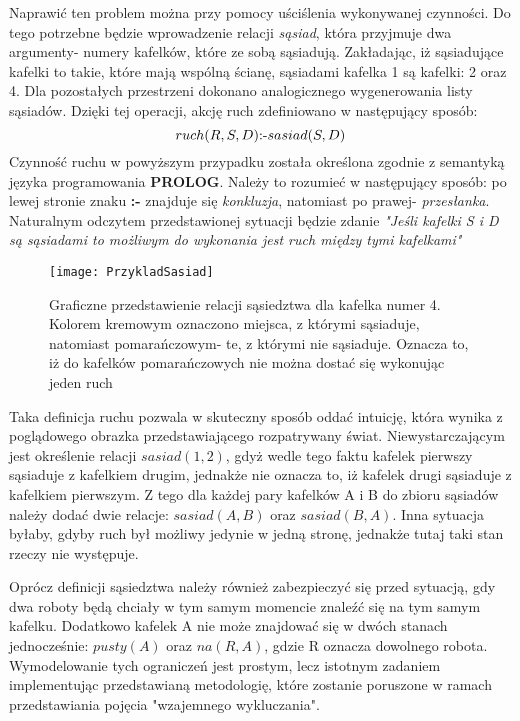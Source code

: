     Naprawić ten problem można przy pomocy uściślenia wykonywanej czynności. Do tego potrzebne będzie wprowadzenie relacji \textit{sąsiad}, która 
    przyjmuje dwa argumenty- numery kafelków, które ze sobą sąsiadują. Zakładając, iż sąsiadujące kafelki to takie, które mają wspólną ścianę, sąsiadami 
    kafelka 1 są kafelki: 2 oraz 4. Dla pozostałych przestrzeni dokonano analogicznego wygenerowania listy sąsiadów. Dzięki tej operacji, 
    akcję ruch zdefiniowano w następujący sposób:
    \begin{equation}
        ruch(R,S,D) \textnormal{:-} sasiad(S,D)
    \end{equation}
    Czynność ruchu w powyższym przypadku została określona zgodnie z semantyką języka programowania \textbf{PROLOG}. Należy to rozumieć w następujący sposób:
    po lewej stronie znaku \textbf{:-} znajduje się \textit{konkluzja}, natomiast po prawej- \textit{przesłanka}. Naturalnym odczytem przedstawionej sytuacji
    będzie zdanie \textit{"Jeśli kafelki S i D są sąsiadami to możliwym do wykonania jest ruch między tymi kafelkami"}
    \begin{figure}[H]
        \texttt{[image: PrzykladSasiad]}
        \centering
        \caption{Graficzne przedstawienie relacji sąsiedztwa dla kafelka numer 4. Kolorem kremowym oznaczono miejsca, z którymi sąsiaduje, natomiast 
        pomarańczowym- te, z którymi nie sąsiaduje. Oznacza to, iż do kafelków pomarańczowych nie można dostać się wykonując jeden ruch}
        \label{PrzykladAkcje}
    \end{figure}
    Taka definicja ruchu pozwala w skuteczny sposób oddać intuicję, która wynika z poglądowego obrazka przedstawiającego rozpatrywany świat.
    Niewystarczającym jest określenie relacji $sasiad(1,2)$, gdyż wedle tego faktu kafelek pierwszy sąsiaduje z kafelkiem drugim, jednakże nie oznacza 
    to, iż kafelek drugi sąsiaduje z kafelkiem pierwszym. Z tego dla każdej pary kafelków A i B do zbioru sąsiadów należy dodać dwie relacje:
    $sasiad(A,B)$ oraz $sasiad(B,A)$. Inna sytuacja byłaby, gdyby ruch był możliwy jedynie w jedną stronę, jednakże tutaj taki stan rzeczy nie występuje.


    Oprócz definicji sąsiedztwa należy również zabezpieczyć się przed sytuacją, gdy dwa roboty będą chciały w tym samym momencie znaleźć się na tym samym 
    kafelku. Dodatkowo kafelek A nie może znajdować się w dwóch stanach jednocześnie: $pusty(A)$ oraz $na(R,A)$, gdzie R oznacza dowolnego robota. 
    Wymodelowanie tych ograniczeń jest prostym, lecz istotnym zadaniem implementując przedstawianą metodologię, które zostanie poruszone w ramach 
    przedstawiania pojęcia "wzajemnego wykluczania".
    
